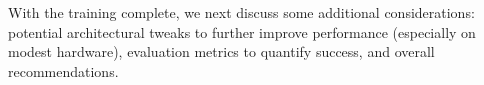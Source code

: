 With the training complete, we next discuss some additional considerations: potential architectural 
tweaks to further improve performance (especially on modest hardware), evaluation metrics to quantify success, and overall recommendations. 

